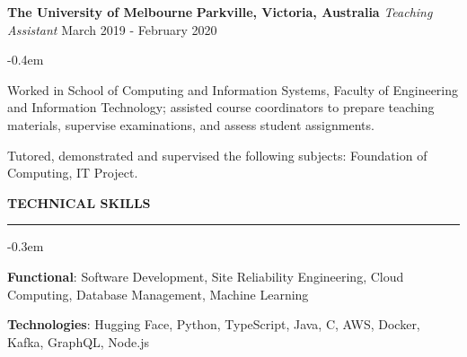 \documentclass{cv}
\begin{document}
\begin{list}{}{\setlength{\leftmargin}{0em}}
\begin{list}{\raisebox{0.2em}{\tiny$\bullet$} \hspace{0em}}{\setlength{\leftmargin}{2.0em}}
    \end{list}
\item
    \textbf{The University of Melbourne} \hfill \textbf{Parkville, Victoria, Australia}%
    \vspace{0.1em} \newline 
    {\textit{Teaching Assistant}} \hfill {March 2019 - February 2020}%
    \begin{list}{\raisebox{0.2em}{\tiny$\bullet$} \hspace{0em}}{\setlength{\leftmargin}{2.0em}}
        \itemsep -0.4em \vspace{-0.4em}
        \item Worked in School of Computing and Information Systems, Faculty of Engineering and Information Technology; assisted course coordinators to prepare teaching materials, supervise examinations, and assess student assignments.
        \item Tutored, demonstrated and supervised the following subjects: Foundation of Computing, IT Project.
    \end{list}
\end{list}


\sectionskip


 \textbf{\uppercase{Technical Skills}}
\sectionlineskip
\hrule
\begin{list}{}{\setlength{\leftmargin}{0em}}
\itemsep -0.3em
\item
    \textbf{Functional}: Software Development, Site Reliability Engineering, Cloud Computing, Database Management, Machine Learning
\item
    \textbf{Technologies}:  Hugging Face, Python, TypeScript, Java, C, AWS, Docker, Kafka, GraphQL, Node.js
\end{list}

\end{document}
